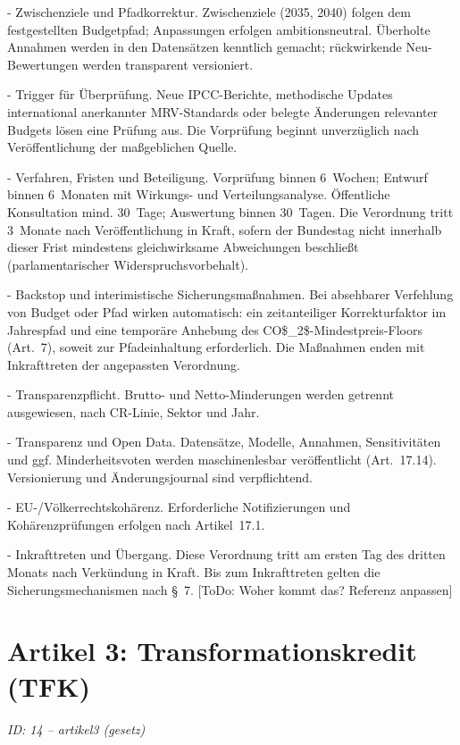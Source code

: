 \documentclass[12pt,a4paper]{scrartcl}
\begin{document}
- Zwischenziele und Pfadkorrektur. Zwischenziele (2035, 2040) folgen dem festgestellten Budgetpfad; Anpassungen erfolgen ambitionsneutral. Überholte Annahmen werden in den Datensätzen kenntlich gemacht; rückwirkende Neu-Bewertungen werden transparent versioniert.

- Trigger für Überprüfung. Neue IPCC-Berichte, methodische Updates international anerkannter MRV-Standards oder belegte Änderungen relevanter Budgets lösen eine Prüfung aus. Die Vorprüfung beginnt unverzüglich nach Veröffentlichung der maßgeblichen Quelle.

- Verfahren, Fristen und Beteiligung. Vorprüfung binnen 6 Wochen; Entwurf binnen 6 Monaten mit Wirkungs- und Verteilungsanalyse. Öffentliche Konsultation mind. 30 Tage; Auswertung binnen 30 Tagen. Die Verordnung tritt 3 Monate nach Veröffentlichung in Kraft, sofern der Bundestag nicht innerhalb dieser Frist mindestens gleichwirksame Abweichungen beschließt (parlamentarischer Widerspruchsvorbehalt).

- Backstop und interimistische Sicherungsmaßnahmen. Bei absehbarer Verfehlung von Budget oder Pfad wirken automatisch: ein zeitanteiliger Korrekturfaktor im Jahrespfad und eine temporäre Anhebung des CO\$\_2\$-Mindestpreis-Floors (Art. 7), soweit zur Pfadeinhaltung erforderlich. Die Maßnahmen enden mit Inkrafttreten der angepassten Verordnung.

- Transparenzpflicht. Brutto- und Netto-Minderungen werden getrennt ausgewiesen, nach CR-Linie, Sektor und Jahr.

- Transparenz und Open Data. Datensätze, Modelle, Annahmen, Sensitivitäten und ggf. Minderheitsvoten werden maschinenlesbar veröffentlicht (Art. 17.14). Versionierung und Änderungsjournal sind verpflichtend.

- EU-/Völkerrechtskohärenz. Erforderliche Notifizierungen und Kohärenzprüfungen erfolgen nach Artikel 17.1.

- Inkrafttreten und Übergang. Diese Verordnung tritt am ersten Tag des dritten Monats nach Verkündung in Kraft. Bis zum Inkrafttreten gelten die Sicherungsmechanismen nach § 7. [ToDo: Woher kommt das? Referenz anpassen]


\section[Artikel 3: Transformationskredit (TFK)]{Artikel 3: Transformationskredit (TFK)}
\noindent\textit{ID: 14 -- artikel3 (gesetz)}
\end{document}
